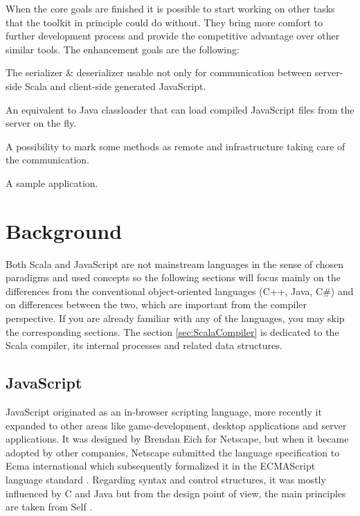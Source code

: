 \documentclass[12pt,a4paper]{report}
\begin{document}
When the core goals are finished it is possible to start working on other tasks that the toolkit in principle could do without. They bring more comfort to further development process and provide the competitive advantage over other similar tools. The enhancement goals are the following:

\begin{description}[style=multiline,leftmargin=5cm]
\item[7 - Serialization] The serializer \& deserializer usable not only for communication between server-side Scala and client-side generated JavaScript.
\item[8 - Loading] An equivalent to Java classloader that can load compiled JavaScript files from the server on the fly.
\item[9 - RPC] A possibility to mark some methods as remote and infrastructure taking care of the communication.
\item[10 - Application] A sample application.
\end{description}



\chapter{Background}

Both Scala and JavaScript are not mainstream languages in the sense of chosen paradigms and used concepts so the following sections will focus mainly on the differences from the conventional object-oriented languages (C++, Java, C\#) and on differences between the two, which are important from the compiler perspective. If you are already familiar with any of the languages, you may skip the corresponding sections. The section \ref{sec:ScalaCompiler} is dedicated to the Scala compiler, its internal processes and related data structures.

\section{JavaScript}

JavaScript \cite{JavaScript} originated as an in-browser scripting language, more recently it expanded to other areas like game-development, desktop applications and server applications. It was designed by Brendan Eich for Netscape, but when it became adopted by other companies, Netscape submitted the language specification to Ecma international which subsequently formalized it in the ECMAScript language standard \cite{EcmaScript}. Regarding syntax and control structures, it was mostly influenced by C and Java but from the design point of view, the main principles are taken from Self \cite{Self}.
\end{document}
